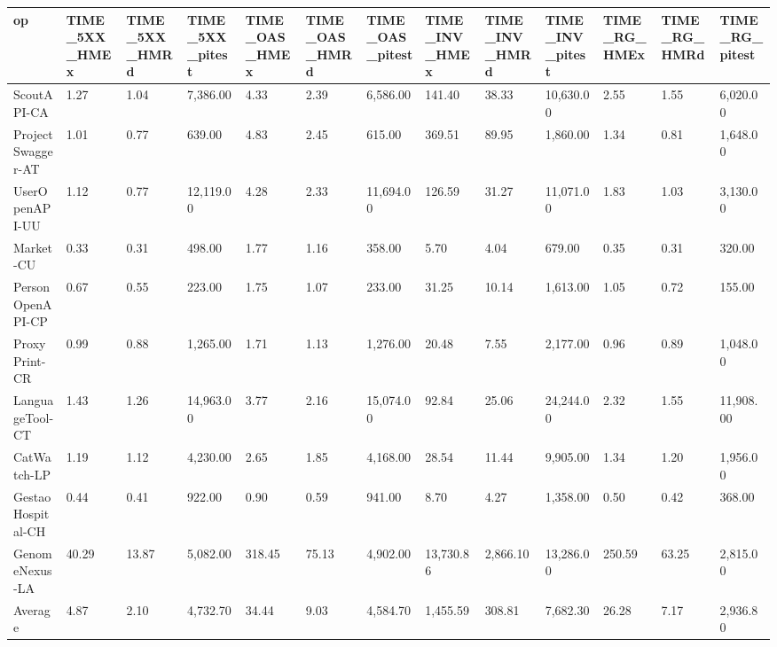 \begin{tabular}{lllllllllllll}
\toprule
op & TIME_5XX_HMEx & TIME_5XX_HMRd & TIME_5XX_pitest & TIME_OAS_HMEx & TIME_OAS_HMRd & TIME_OAS_pitest & TIME_INV_HMEx & TIME_INV_HMRd & TIME_INV_pitest & TIME_RG_HMEx & TIME_RG_HMRd & TIME_RG_pitest \\
\midrule
ScoutAPI-CA & 1.27 & 1.04 & 7,386.00 & 4.33 & 2.39 & 6,586.00 & 141.40 & 38.33 & 10,630.00 & 2.55 & 1.55 & 6,020.00 \\
ProjectSwagger-AT & 1.01 & 0.77 & 639.00 & 4.83 & 2.45 & 615.00 & 369.51 & 89.95 & 1,860.00 & 1.34 & 0.81 & 1,648.00 \\
UserOpenAPI-UU & 1.12 & 0.77 & 12,119.00 & 4.28 & 2.33 & 11,694.00 & 126.59 & 31.27 & 11,071.00 & 1.83 & 1.03 & 3,130.00 \\
Market-CU & 0.33 & 0.31 & 498.00 & 1.77 & 1.16 & 358.00 & 5.70 & 4.04 & 679.00 & 0.35 & 0.31 & 320.00 \\
PersonOpenAPI-CP & 0.67 & 0.55 & 223.00 & 1.75 & 1.07 & 233.00 & 31.25 & 10.14 & 1,613.00 & 1.05 & 0.72 & 155.00 \\
ProxyPrint-CR & 0.99 & 0.88 & 1,265.00 & 1.71 & 1.13 & 1,276.00 & 20.48 & 7.55 & 2,177.00 & 0.96 & 0.89 & 1,048.00 \\
LanguageTool-CT & 1.43 & 1.26 & 14,963.00 & 3.77 & 2.16 & 15,074.00 & 92.84 & 25.06 & 24,244.00 & 2.32 & 1.55 & 11,908.00 \\
CatWatch-LP & 1.19 & 1.12 & 4,230.00 & 2.65 & 1.85 & 4,168.00 & 28.54 & 11.44 & 9,905.00 & 1.34 & 1.20 & 1,956.00 \\
GestaoHospital-CH & 0.44 & 0.41 & 922.00 & 0.90 & 0.59 & 941.00 & 8.70 & 4.27 & 1,358.00 & 0.50 & 0.42 & 368.00 \\
GenomeNexus-LA & 40.29 & 13.87 & 5,082.00 & 318.45 & 75.13 & 4,902.00 & 13,730.86 & 2,866.10 & 13,286.00 & 250.59 & 63.25 & 2,815.00 \\
Average & 4.87 & 2.10 & 4,732.70 & 34.44 & 9.03 & 4,584.70 & 1,455.59 & 308.81 & 7,682.30 & 26.28 & 7.17 & 2,936.80 \\
\bottomrule
\end{tabular}
